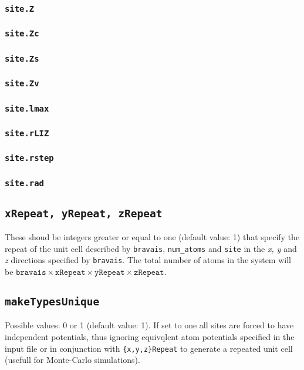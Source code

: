 \subsubsection{\texttt{site.Z}}

\subsubsection{\texttt{site.Zc}}

\subsubsection{\texttt{site.Zs}}

\subsubsection{\texttt{site.Zv}}

\subsubsection{\texttt{site.lmax}}

\subsubsection{\texttt{site.rLIZ}}

\subsubsection{\texttt{site.rstep}}

\subsubsection{\texttt{site.rad}}

\subsection{\texttt{xRepeat, yRepeat, zRepeat}}
These shoud be integers greater or equal to one (default value: 1)
that specify the repeat of the unit cell described by
\texttt{bravais}, \texttt{num\_atoms} and \texttt{site} in the
\textit{x, y} and \textit{z} directions specified by \texttt{bravais}.
The total number of atoms in the system will be $\texttt{bravais}
\times \texttt{xRepeat} \times \texttt{yRepeat} \times \texttt{zRepeat}$.

\subsection{\texttt{makeTypesUnique}}
Possible values: 0 or 1 (default value: 1). If set to one all sites are forced to have
independent potentials, thus ignoring equivqlent atom potentials
specified in the input file or in conjunction with
\texttt{\{x,y,z\}Repeat} to generate a repeated unit cell (usefull for
Monte-Carlo simulations).

